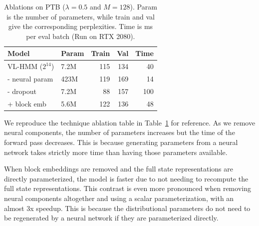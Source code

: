 \documentclass[11pt,a4paper]{article}
\begin{document}
\begin{table}[t]
\centering
\begin{tabular}{llrrr}
\toprule
Model                & Param & Train  & Val & Time \\
\midrule
VL-HMM ($2^{14}$)    & 7.2M & 115    & 134 & 40\\
\quad - neural param & 423M & 119    & 169 & 14\\
\quad - dropout      & 7.2M & 88     & 157 & 100\\
\quad + block emb    & 5.6M & 122    & 136 & 48\\
\bottomrule
\end{tabular}
\caption{\label{tbl:dropout-param-ablation-repeat}
Ablations on \textsc{PTB} ($\lambda =0.5$ and $M=128$).
Param is the number of parameters, while train and val give the corresponding perplexities.
Time is ms per eval batch (Run on RTX 2080).
}
\end{table}

We reproduce the technique ablation table in
Table~\ref{tbl:dropout-param-ablation-repeat} for reference.
As we remove neural components, 
the number of parameters increases but the time of the
forward pass decreases.
This is because generating parameters from a neural network
takes strictly more time than having those parameters available.

When block embeddings are removed and the full state representations are
directly parameterized,
the model is faster due to not needing to recompute the full state representations.
This contrast is even more pronounced when removing neural components altogether and using a scalar parameterization, with an almost 3x speedup. This is because the distributional parameters do not need to be regenerated by a neural network if they are parameterized directly.
    
\end{document}
